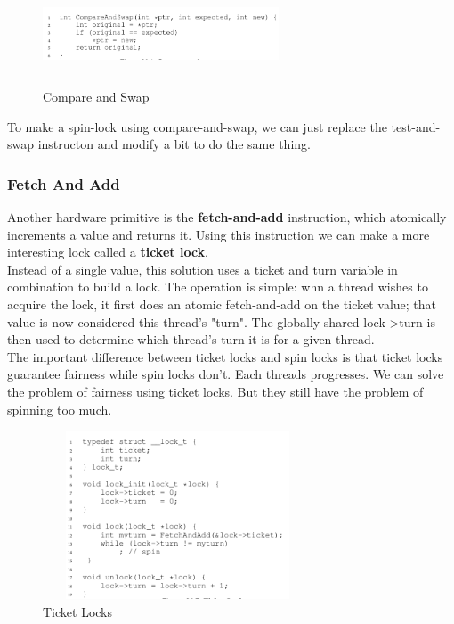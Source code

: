 \begin{figure}[h!]
    \begin{center}
        \includegraphics[width=7cm, height=3cm]{img/284.png}
        \caption{Compare and Swap}
    \end{center}
\end{figure}

To make a spin-lock using compare-and-swap, we can just replace the test-and-swap
instructon and modify a bit to do the same thing.

\subsubsection{Fetch And Add}

Another hardware primitive is the \textbf{fetch-and-add} instruction, which
atomically increments a value and returns it. Using this instruction we can make
a more interesting lock called a \textbf{ticket lock}.\\

Instead of a single value, this solution uses a ticket and turn variable in
combination to build a lock. The operation is simple: whn a thread wishes to
acquire the lock, it first does an atomic fetch-and-add on the ticket value;
that value is now considered this thread's "turn". The globally shared lock->turn
is then used to determine which thread's turn it is for a given thread. \\

The important difference between ticket locks and spin locks is that ticket
locks guarantee fairness while spin locks don't. Each threads progresses. We
can solve the problem of fairness using ticket locks. But they still have
the problem of spinning too much.

\begin{figure}[h!]
    \begin{center}
        \includegraphics[width=8cm, height=5cm]{img/287.png}
        \caption{Ticket Locks}
    \end{center}
\end{figure}

